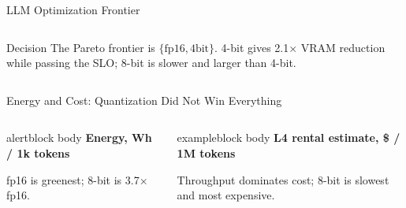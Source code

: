 \documentclass[aspectratio=169,10pt]{beamer}
\newcommand{\source}[1]{%
}
\newcommand{\chartbar}[5]{%
  \node[anchor=east] at (0,#1) {\scriptsize #2};
  \fill[#3] (0.15,#1-0.11) rectangle (#4,#1+0.11);
  \node[anchor=west] at (#4+0.10,#1) {\scriptsize #5};
}
\begin{document}
\begin{frame}{LLM Optimization Frontier}
  \vspace{0.16cm}
  \begin{columns}[T,totalwidth=\textwidth]
    \begin{exampleblock}{Decision}
      The Pareto frontier is \(\{\mathrm{fp16}, \mathrm{4bit}\}\). 4-bit gives 2.1\(\times\) VRAM reduction while passing the SLO; 8-bit is slower and larger than 4-bit.
    \end{exampleblock}
  \end{columns}
  \source{Benchmark report Section 3; LLM Pareto artifact.}
\end{frame}

\begin{frame}{Energy and Cost: Quantization Did Not Win Everything}
  \scriptsize
  \begin{columns}[T,totalwidth=\textwidth]
    \begin{beamercolorbox}[wd=\textwidth,rounded=true,sep=0.70em]{alertblock body}
      \textbf{Energy, Wh / 1k tokens}
      \vspace{0.05cm}
      {\scriptsize fp16 is greenest; 8-bit is 3.7\(\times\) fp16.}
    \end{beamercolorbox}

    \begin{beamercolorbox}[wd=\textwidth,rounded=true,sep=0.70em]{exampleblock body}
      \textbf{L4 rental estimate, \$ / 1M tokens}
      \vspace{0.05cm}
      {\scriptsize Throughput dominates cost; 8-bit is slowest and most expensive.}
    \end{beamercolorbox}
  \end{columns}


\end{frame}
\end{document}
